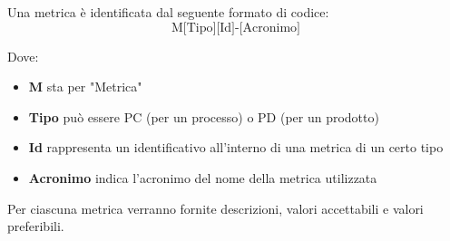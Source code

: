 Una metrica è identificata dal seguente formato di codice:
\[
\text{M[Tipo][Id]-[Acronimo]}
\]

Dove:
\begin{itemize}
    \item \textbf{M} sta per "Metrica"
    \item \textbf{Tipo} può essere PC (per un processo) o PD (per un prodotto)
    \item \textbf{Id} rappresenta un identificativo all'interno di una metrica di un certo tipo
    \item \textbf{Acronimo} indica l'acronimo del nome della metrica utilizzata
\end{itemize}

Per ciascuna metrica verranno fornite descrizioni, valori accettabili e valori preferibili.
